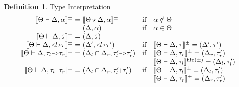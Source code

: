 \documentclass[acmsmall]{acmart}
\theoremstyle{definition}
\newtheorem{definition}{Definition}[section]
\begin{document}
\begin{definition} 
  \label{def:type_interpretation}
  Type Interpretation 
  \hfill
  \\
  \[
  \begin{array}[t]{r@{}c@{}lcl}
      \llbracket \Theta \entails \Delta, \alpha \rrbracket^\pm 
      &\ =\ & 
      \llbracket \Theta \star \Delta, \alpha \rrbracket^\pm
      &\text{if}& 
      \alpha \notin \Theta

      \\

      &&
      (\Delta, \alpha)
      &\text{if}&
      \alpha \in \Theta

      \\

      \llbracket \Theta \entails \Delta, \J{@} \rrbracket^\pm 
      &\ =\ & 
      (\Delta, \J{@})
      &&

      \\

      \llbracket \Theta \entails \Delta, \J{<}l\J{>}\tau \rrbracket^\pm
      &\ =\ & 
      (\Delta', \J{<}l\J{>}\tau')
      &\text{if}& 
      \llbracket \Theta \entails \Delta, \tau \rrbracket^\pm = (\Delta', \tau')

      \\

      \llbracket \Theta \entails \Delta, \tau_l\J{->}\tau_r \rrbracket^\pm 
      &\ =\ & 
      (\Delta_l \cap \Delta_r, \tau_l'\J{->}\tau_r')
      &\text{if}& 
      \begin{array}[t]{@{}l}
        \llbracket \Theta \entails \Delta, \tau_r \rrbracket^\pm = (\Delta_r, \tau_r')
        \\
        \llbracket \Theta \entails \Delta, \tau_l \rrbracket^{\text{flip}(\pm)} = (\Delta_l, \tau_l')
      \end{array}

      \\

      \llbracket \Theta \entails \Delta, \tau_l\J{|}\tau_r \rrbracket^\pm
      &\ =\ & 
      (\Delta_l \cap \Delta_r, \tau_l'\J{|}\tau_r')
      &\text{if}& 
      \begin{array}[t]{@{}l}
        \llbracket \Theta \entails \Delta, \tau_l \rrbracket^\pm = (\Delta_l, \tau_l')
        \\
        \llbracket \Theta \entails \Delta, \tau_r \rrbracket^{\pm} = (\Delta_r, \tau_r')
      \end{array}


\end{array}\]
\end{definition}
\end{document}
